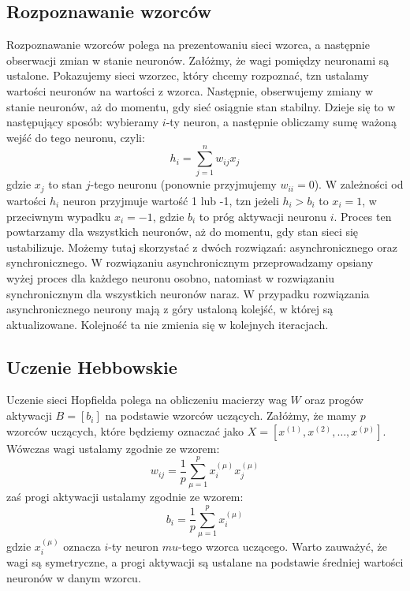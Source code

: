 \documentclass{article}
\begin{document}
\subsection{Rozpoznawanie wzorców}
Rozpoznawanie wzorców polega na prezentowaniu sieci wzorca, a następnie obserwacji zmian w stanie neuronów.
Załóżmy, że wagi pomiędzy neuronami są ustalone.
Pokazujemy sieci wzorzec, który chcemy rozpoznać, tzn ustalamy wartości neuronów na wartości z wzorca.
Następnie, obserwujemy zmiany w stanie neuronów, aż do momentu, gdy sieć osiągnie stan stabilny.
Dzieje się to w następujący sposób: wybieramy $i$-ty neuron, 
a następnie obliczamy sumę ważoną wejść do tego neuronu, czyli:
$$h_i = \sum_{j=1}^{n} w_{ij} x_j$$
gdzie $x_j$ to stan $j$-tego neuronu (ponownie przyjmujemy $w_{ii} = 0$). 
W zależności od wartości $h_i$ neuron przyjmuje wartość 1 lub -1, 
tzn jeżeli $h_i > b_{i}$ to $x_i = 1$, w przeciwnym wypadku $x_i = -1$,
gdzie $b_{i}$ to próg aktywacji neuronu $i$. Proces ten powtarzamy dla wszystkich neuronów, aż do momentu, gdy stan sieci się ustabilizuje.
Możemy tutaj skorzystać z dwóch rozwiązań: asynchronicznego oraz synchronicznego.
W rozwiązaniu asynchronicznym przeprowadzamy opsiany wyżej proces dla każdego neuronu osobno,
natomiast w rozwiązaniu synchronicznym dla wszystkich neuronów naraz. W przypadku 
rozwiązania asynchronicznego neurony mają z góry ustaloną kolejść, w której są aktualizowane.
Kolejność ta nie zmienia się w kolejnych iteracjach.


\subsection{Uczenie Hebbowskie}
Uczenie sieci Hopfielda polega na obliczeniu macierzy wag $W$ oraz progów aktywacji $B = [b_i]$ 
na podstawie wzorców uczących. Załóżmy, że mamy $p$ wzorców uczących, które będziemy oznaczać jako $X = [x^{(1)}, x^{(2)}, \ldots, x^{(p)}]$.
Wówczas wagi ustalamy zgodnie ze wzorem:
$$w_{ij} = \frac{1}{p} \sum_{\mu=1}^{p} x_i^{(\mu)} x_j^{(\mu)}$$
zaś progi aktywacji ustalamy zgodnie ze wzorem:
$$b_i = \frac{1}{p}\sum_{\mu=1}^{p} x_i^{(\mu)}$$
gdzie $x_i^{(\mu)}$ oznacza $i$-ty neuron $mu$-tego wzorca uczącego.
Warto zauważyć, że wagi są symetryczne, a progi aktywacji są ustalane na podstawie średniej wartości neuronów w danym wzorcu.
\end{document}
